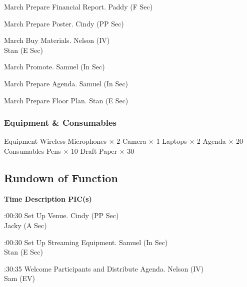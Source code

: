 \bTR{}
\eTD{} March
\eTD\bTD Prepare Financial Report.
\eTD\bTD Paddy (F Sec)
\eTD\eTR

\bTR{}
\eTD{} March
\eTD\bTD Prepare Poster.
\eTD\bTD Cindy (PP Sec)
\eTD\eTR

\bTR{}
\eTD{} March
\eTD\bTD Buy Materials.
\eTD\bTD Nelson (IV) \\ Stan (E Sec)
\eTD\eTR

\bTR{}
\eTD{} March
\eTD\bTD Promote.
\eTD\bTD Samuel (In Sec)
\eTD\eTR

\bTR{}
\eTD{} March
\eTD\bTD Prepare Agenda.
\eTD\bTD Samuel (In Sec)
\eTD\eTR

\bTR{}
\eTD{} March
\eTD\bTD Prepare Floor Plan.
\eTD\bTD Stan (E Sec)
\eTD\eTR

\eTABLEbody
\eTABLE

\subsubsection{Equipment \& Consumables}
\starttabulate[|l|l|]
\NC{}Equipment\NC\NR
\HL
\NC Wireless Microphones \NC $\times$ 2 \NR
\NC Camera \NC $\times$ 1 \NR
\NC Laptops \NC $\times$ 2 \NR
\NC Agenda \NC $\times$ 20 \NR
\HL
\NR
\NC{}Consumables\NC\NR
\HL
\NC Pens \NC $\times$ 10 \NR
\NC Draft Paper \NC $\times$ 30 \NR
\HL
\stoptabulate

\subsection{Rundown of Function}

\setupTABLE[c][1][width=1.25in]
\setupTABLE[c][2][width=3.5in]
\setupTABLE[c][3][width=1.25in]
\bTABLE
\bTABLEhead

\bTR\bTH    \bf{Time}
\eTH\bTH    \bf{Description}
\eTH\bTH    \bf{PIC(s)}
\eTH\eTR

\eTABLEhead
\bTABLEbody

\bTR{}:00:30
\eTD\bTD Set Up Venue.
\eTD\bTD Cindy (PP Sec) \\ Jacky (A Sec)
\eTD\eTR

\bTR{}:00:30
\eTD\bTD Set Up Streaming Equipment.
\eTD\bTD Samuel (In Sec) \\ Stan (E Sec)
\eTD\eTR

\bTR{}:30:35
\eTD\bTD Welcome Participants and Distribute Agenda.
\eTD\bTD Nelson (IV) \\ Sam (EV)
\eTD\eTR

